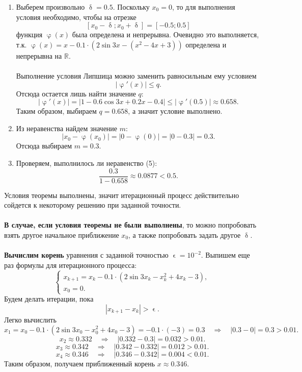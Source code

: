 \documentclass[a4paper, 12pt]{article}
\newcommand{\Rm}{\mathbb{R}}
\renewcommand{\leq}{\leqslant}
\renewcommand{\delta}{\updelta}
\renewcommand{\varphi}{\upvarphi}
\renewcommand{\epsilon}{\upvarepsilon}
\begin{document}
	\begin{enumerate}
		\item Выберем произвольно $\delta = 0.5$. Поскольку $x_0 = 0$, то для выполнения условия необходимо, чтобы на отрезке $$[x_0 - \delta; x_0 + \delta] = [-0.5; 0.5]$$ функция $\varphi(x)$ была определена и непрерывна. Очевидно это выполняется, т.к. $\varphi(x) = x - 0.1\cdot (2\sin 3x - (x^2 - 4x+3))$ определена и непрерывна на $\Rm$.\\\\
		Выполнение условия Липшица можно заменить равносильным ему условием $$|\varphi'(x)| \leq q.$$
		Отсюда остается лишь найти значение $q$: $$|\varphi'(x)| = |1 - 0.6\cos3x + 0.2x - 0.4| \leq |\varphi'(0.5)| \approx 0.658.$$
		Таким образом, выбираем $q = 0.658$, а значит условие выполнено.
		\item Из неравенства найдем значение $m$: $$|x_0 - \varphi(x_0)|  =|0-\varphi(0)| = |0- 0.3| = 0.3.$$
	Отсюда выбираем $m=0.3$.
	\item Проверяем, выполнилось ли неравенство (5): $$\dfrac{0.3}{1-0.658} \approx 0.0877 < 0.5.$$
	\end{enumerate}
	Условия теоремы выполнены, значит итерационный процесс действительно сойдется к некоторому решению при заданной точности. \\\\
	\textbf{В случае, если условия теоремы не были выполнены}, то можно попробовать взять другое начальное приближение $x_0$, а также попробовать задать другое $\delta$.\\\\
	\textbf{Вычислим корень} уравнения с заданной точностью $\epsilon=10^{-2}$. Выпишем еще раз формулы для итерационного процесса:
	$$\begin{cases}
		x_{k+1} = x_k - 0.1\cdot (2\sin 3x_k - x_k^2 + 4x_k-3),\\
		x_0 = 0.
	\end{cases}$$
	Будем делать итерации, пока $$|x_{k+1} - x_k| > \epsilon.$$
	Легко вычислить $$x_1 = x_0 - 0.1\cdot (2\sin 3x_0 - x_0^2 + 4x_0-3) = -0.1\cdot(-3) = 0.3 \quad \Rightarrow \quad |0.3 - 0| = 0.3 > 0.01.$$
	$$x_2 \approx 0.332 \quad \Rightarrow \quad |0.332 - 0.3| = 0.032 > 0.01.$$
	$$x_3 \approx 0.342 \quad \Rightarrow \quad |0.342 - 0.332| = 0.012 > 0.01.$$
	$$x_4 \approx 0.346 \quad \Rightarrow \quad |0.346 - 0.342| = 0.004 < 0.01.$$
	Таким образом, получаем приближенный корень $x \approx 0.346$.
\end{document}

